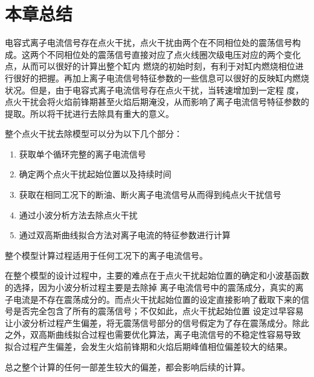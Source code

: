 \section{本章总结}
电容式离子电流信号存在点火干扰，点火干扰由两个在不同相位处的震荡信号构成。这两个不同相位处的震荡信号直接对应了点火线圈次级电压对应的两个变化点，从而可以很好的计算出整个缸内
燃烧的初始时刻，有利于对缸内燃烧相位进行很好的把握。再加上离子电流信号特征参数的一些信息可以很好的反映缸内燃烧状况。但是，由于电容式离子电流信号存在点火干扰，当转速增加到一定程
度，点火干扰会将火焰前锋期甚至火焰后期淹没，从而影响了离子电流信号特征参数的提取。所以将干扰进行去除具有重大的意义。\par
整个点火干扰去除模型可以分为以下几个部分：
\begin{enumerate}[1)]
	\item 获取单个循环完整的离子电流信号
	\item 确定两个点火干扰起始位置以及持续时间
	\item 获取在相同工况下的断油、断火离子电流信号从而得到纯点火干扰信号
	\item 通过小波分析方法去除点火干扰
	\item 通过双高斯曲线拟合方法对离子电流的特征参数进行计算
\end{enumerate}
\par
整个模型计算过程适用于任何工况下的离子电流信号。\par
在整个模型的设计过程中，主要的难点在于点火干扰起始位置的确定和小波基函数的选择，因为小波分析过程主要是去除掉
离子电流信号中的震荡成分，真实的离子电流是不存在震荡成分的。而点火干扰起始位置的设定直接影响了截取下来的信号是否完全包含了所有的震荡信号；不仅如此，点火干扰起始位置
设定过早容易让小波分析过程产生偏差，将无震荡信号部分的信号假定为了存在震荡成分。除此之外，双高斯曲线拟合过程也需要优化算法，离子电流信号的不稳定性容易导致
拟合过程产生偏差，会发生火焰前锋期和火焰后期峰值相位偏差较大的结果。\par
总之整个计算的任何一部差生较大的偏差，都会影响后续的计算。